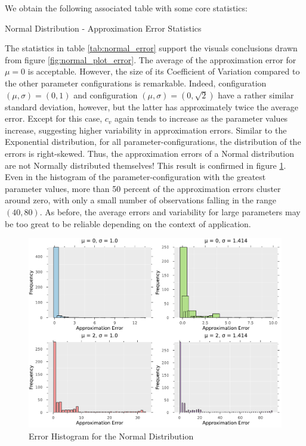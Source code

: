 We obtain the following associated table with some core statistics:
\begin{table}[H]
    \centering

\caption{Normal Distribution - Approximation Error Statistics} 
\label{tab:normal_error}
\end{table}
The statistics in table \ref{tab:normal_error} support the visuals conclusions drawn from figure \ref{fig:normal_plot_error}. The average of the approximation error for \(\mu = 0\) is acceptable. However, the size of its Coefficient of Variation compared to the other parameter configurations is remarkable. Indeed, configuration \((\mu, \sigma) = (0, 1)\) and configuration \((\mu, \sigma) = (0, \sqrt{2})\) have a rather similar standard deviation, however, but the latter has approximately twice the average error. Except for this case, \(c_v\) again tends to increase as the parameter values increase, suggesting higher variability in approximation errors. Similar to the Exponential distribution, for all parameter-configurations, the distribution of the errors is right-skewed. Thus, the approximation errors of a Normal distribution are not Normally distributed themselves! This result is confirmed in figure \ref{fig:error_histogram}. Even in the histogram of the parameter-configuration with the greatest parameter values, more than 50 percent of the approximation errors cluster around zero, with only a small number of observations falling in the range \((40, 80)\). As before, the average errors and variability for large parameters may be too great to be reliable depending on the context of application.

\begin{figure}[H]
    \centering
    \includegraphics[width=1\textwidth]{figures/error_histogram.pdf}
    \caption{Error Histogram for the Normal Distribution}
    \label{fig:error_histogram}
\end{figure}

